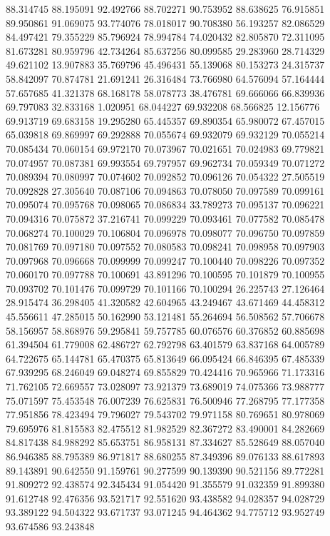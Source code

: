 88.314745
88.195091
92.492766
88.702271
90.753952
88.638625
76.915851
89.950861
91.069075
93.774076
78.018017
90.708380
56.193257
82.086529
84.497421
79.355229
85.796924
78.994784
74.020432
82.805870
72.311095
81.673281
80.959796
42.734264
85.637256
80.099585
29.283960
28.714329
49.621102
13.907883
35.769796
45.496431
55.139068
80.153273
24.315737
58.842097
70.874781
21.691241
26.316484
73.766980
64.576094
57.164444
57.657685
41.321378
68.168178
58.078773
38.476781
69.666066
66.839936
69.797083
32.833168
1.020951
68.044227
69.932208
68.566825
12.156776
69.913719
69.683158
19.295280
65.445357
69.890354
65.980072
67.457015
65.039818
69.869997
69.292888
70.055674
69.932079
69.932129
70.055214
70.085434
70.060154
69.972170
70.073967
70.021651
70.024983
69.779821
70.074957
70.087381
69.993554
69.797957
69.962734
70.059349
70.071272
70.089394
70.080997
70.074602
70.092852
70.096126
70.054322
27.505519
70.092828
27.305640
70.087106
70.094863
70.078050
70.097589
70.099161
70.095074
70.095768
70.098065
70.086834
33.789273
70.095137
70.096221
70.094316
70.075872
37.216741
70.099229
70.093461
70.077582
70.085478
70.068274
70.100029
70.106804
70.096978
70.098077
70.096750
70.097859
70.081769
70.097180
70.097552
70.080583
70.098241
70.098958
70.097903
70.097968
70.096668
70.099999
70.099247
70.100440
70.098226
70.097352
70.060170
70.097788
70.100691
43.891296
70.100595
70.101879
70.100955
70.093702
70.101476
70.099729
70.101166
70.100294
26.225743
27.126464
28.915474
36.298405
41.320582
42.604965
43.249467
43.671469
44.458312
45.556611
47.285015
50.162990
53.121481
55.264694
56.508562
57.706678
58.156957
58.868976
59.295841
59.757785
60.076576
60.376852
60.885698
61.394504
61.779008
62.486727
62.792798
63.401579
63.837168
64.005789
64.722675
65.144781
65.470375
65.813649
66.095424
66.846395
67.485339
67.939295
68.246049
69.048274
69.855829
70.424416
70.965966
71.173316
71.762105
72.669557
73.028097
73.921379
73.689019
74.075366
73.988777
75.071597
75.453548
76.007239
76.625831
76.500946
77.268795
77.177358
77.951856
78.423494
79.796027
79.543702
79.971158
80.769651
80.978069
79.695976
81.815583
82.475512
81.982529
82.367272
83.490001
84.282669
84.817438
84.988292
85.653751
86.958131
87.334627
85.528649
88.057040
86.946385
88.795389
86.971817
88.680255
87.349396
89.076133
88.617893
89.143891
90.642550
91.159761
90.277599
90.139390
90.521156
89.772281
91.809272
92.438574
92.345434
91.054420
91.355579
91.032359
91.899380
91.612748
92.476356
93.521717
92.551620
93.438582
94.028357
94.028729
93.389122
94.504322
93.671737
93.071245
94.464362
94.775712
93.952749
93.674586
93.243848
